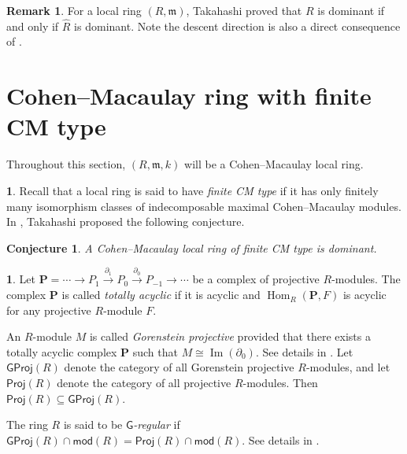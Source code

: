 \documentclass{amsart}
\newcommand{\G}{\mathsf{G}}
\newcommand{\0}{{\bf{0}}}
\newcommand{\m}{\mathfrak{m}}
\DeclareMathOperator{\Hom}{Hom}
\newcommand{\mo}{\mathsf{mod}}
\newcommand{\Proj}{\mathsf{Proj}}
\newcommand{\GProj}{\mathsf{GProj}}
\newtheorem*{Conjecture}{Conjecture}
\theoremstyle{definition}
\newtheorem{remark}[theorem]{Remark}
\newtheorem{chunk}[theorem]{}
\begin{document}
\begin{remark}\label{completion}
       For a local ring $(R,\m)$, Takahashi \cite[Corollary 5.8]{Takahashi:2023} proved that $R$ is dominant if and only if $\widehat{R}$ is dominant. Note the descent direction is also a direct consequence of . 
\end{remark}

\section{Cohen--Macaulay ring with finite CM type}
Throughout this section, $(R,\m,k)$ will be a Cohen--Macaulay local ring.


   








\begin{chunk}
Recall that a local ring is said to have \emph{finite CM type} if it has only finitely many isomorphism classes of indecomposable maximal Cohen--Macaulay modules. In \cite[Conjecture 9.1]{Takahashi:2023}, Takahashi proposed the following conjecture.
\begin{Conjecture}
A Cohen--Macaulay local ring of finite CM type is dominant.
\end{Conjecture}
\end{chunk}


\begin{chunk}
Let $
\mathbf{P}=\cdots \longrightarrow P_{1}\stackrel{\partial_{1}}\longrightarrow
P_0\stackrel{\partial_0}\longrightarrow P_{-1}\longrightarrow\cdots
$
be a complex of projective $R$-modules. The complex $\mathbf P$ 
is called \emph{totally acyclic} if it is acyclic and
$\Hom_R(\mathbf{P},F)$ is acyclic for any projective $R$-module $F$.

An $R$-module $M$ is called \emph{Gorenstein projective} provided that there exists
a totally acyclic complex $\mathbf{P}$ such that
$
M\cong\operatorname{Im}(\partial_0).
$
See details in \cite[Chapter 10]{EJ}.
Let $\GProj(R)$ denote the category of all Gorenstein projective $R$-modules, and let $\Proj(R)$ denote the category of all projective $R$-modules. Then $\Proj(R)\subseteq \GProj(R)$.  

The ring $R$ is said to be \emph{$\G$-regular} if $\GProj(R)\cap \mo(R)=\Proj(R)\cap \mo(R)$. See details in \cite{Takahashi2008}.
\end{chunk}
\end{document}
